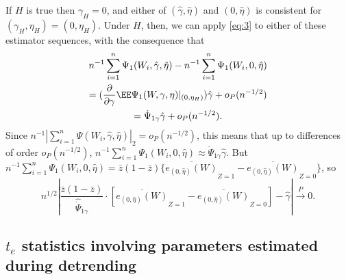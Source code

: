 If $H$ is true then $\gamma_{H}=0$, and either of $(\hat\gamma,
\hat\eta)$ and $(0, \hat\eta)$  is consistent for $(\gamma_H,
\eta_H) = (0, \eta_{H})$.  Under $H$, then, we can apply \eqref{eq:3}
to either of these estimator sequences, with the consequence that
\begin{multline*}
n^{-1}\sum_{i=1}^n \Psi_1(W_i, \hat{\gamma}, \hat{\eta}) - n^{-1}\sum_{i=1}^n \Psi_1(W_i, 0, \hat{\eta})\\= (\frac{\partial}{\partial\gamma} \EE \Psi_{1}(W,\gamma, \eta)
|_{(0, \eta_{H})}) \hat{\gamma} + o_{P}(n^{-1/2}) \\
= {\dot{\Psi}}_{1\gamma} \hat{\gamma} + o_{P}(n^{-1/2}) .
\end{multline*}
Since $n^{-1}|\sum_{i=1}^n \Psi(W_i, \hat{\gamma}, \hat{\eta})|_{2} =
o_{P}(n^{-1/2})$, this means that up to differences of order
$o_{P}(n^{-1/2})$, $n^{-1}\sum_{i=1}^n \Psi_1(W_i, 0, \hat{\eta})
\approx  \dot{\Psi}_{1 \gamma} \hat\gamma$.  But
$n^{-1}\sum_{i=1}^n \Psi_1(W_i, 0, \hat{\eta}) =
\bar{z}(1-\bar{z})\{\overline{e_{(0,\hat\eta)}(W)}_{Z=1} -
\overline{e_{(0,\hat\eta)}(W)}_{Z=0}\}$, so
\begin{equation*}
n^{1/2}\left| \frac{\bar{z}(1-\bar{z})}{\hat{\dot{\Psi}}_{1\gamma} }
\cdot
\left[
\overline{e_{(0,\hat\eta)}(W)}_{Z=1} -
\overline{e_{(0,\hat\eta)}(W)}_{Z=0} \right]
- \hat\gamma \right|
\stackrel{P}{\rightarrow} 0.
\end{equation*}

\subsection{$t_{e}$ statistics involving parameters estimated during detrending}
\label{apnd:requ-forpr-eqref}


